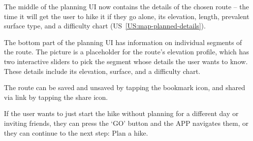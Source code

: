 The middle of the planning UI now contains the details of the chosen route -- the time it will get the user to hike it if they go alone, its elevation, length, prevalent surface type, and a difficulty chart (US~\ref{US:map-planned-details}).

The bottom part of the planning UI has information on individual segments of the route.
The picture is a placeholder for the route's elevation profile, which has two interactive sliders to pick the segment whose details the user wants to know.
These details include its elevation, surface, and a difficulty chart.

The route can be saved and unsaved by tapping the bookmark icon, and shared via link by tapping the share icon.

If the user wants to just start the hike without planning for a different day or inviting friends, they can press the `GO' button and the APP navigates them,
or they can continue to the next step: Plan a hike.

